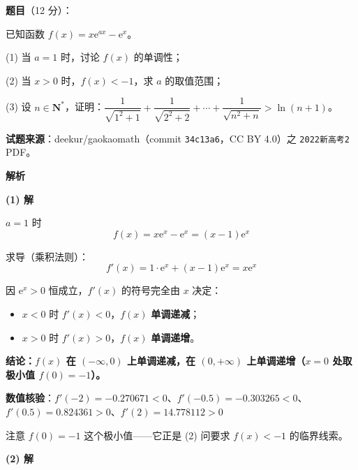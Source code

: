 \begin{answer}

\textbf{题目}（12 分）：

已知函数 $f(x)=x\mathrm e^{ax}-\mathrm e^{x}$。

  (1) 当 $a=1$ 时，讨论 $f(x)$ 的单调性；

  (2) 当 $x>0$ 时，$f(x)<-1$，求 $a$ 的取值范围；

  (3) 设 $n\in\mathbf N^{*}$，证明：$\dfrac1{\sqrt{1^{2}+1}}+\dfrac1{\sqrt{2^{2}+2}}+\cdots+\dfrac1{\sqrt{n^{2}+n}}>\ln(n+1)$。

\par\medskip

\begin{gktip}
\textbf{试题来源}：deekur/gaokaomath（commit \texttt{34c13a6}，CC BY 4.0）之 \texttt{2022新高考2} PDF。
\end{gktip}

\textbf{解析}

\par\medskip

\textbf{(1) 解}

$a=1$ 时
\nopagebreak[4]
\[f(x)=x\mathrm e^{x}-\mathrm e^{x}=(x-1)\mathrm e^{x}\]

求导（乘积法则）：
\nopagebreak[4]
\[f'(x)=1\cdot\mathrm e^{x}+(x-1)\mathrm e^{x}=x\mathrm e^{x}\]

因 $\mathrm e^{x}>0$ 恒成立，$f'(x)$ 的符号完全由 $x$ 决定：

\begin{itemize}
\item $x<0$ 时 $f'(x)<0$，$f(x)$ \textbf{单调递减}；
\item $x>0$ 时 $f'(x)>0$，$f(x)$ \textbf{单调递增}。
\end{itemize}

\textbf{结论：$f(x)$ 在 $(-\infty,0)$ 上单调递减，在 $(0,+\infty)$ 上单调递增（$x=0$ 处取极小值 $f(0)=-1$）。}

\textbf{数值核验}：$f'(-2)=-0.270671<0$、$f'(-0.5)=-0.303265<0$、$f'(0.5)=0.824361>0$、$f'(2)=14.778112>0$ 

\begin{gktip}
注意 $f(0)=-1$ 这个极小值——它正是 (2) 问要求 $f(x)<-1$ 的临界线索。
\end{gktip}

\par\medskip

\textbf{(2) 解}


\end{answer}
